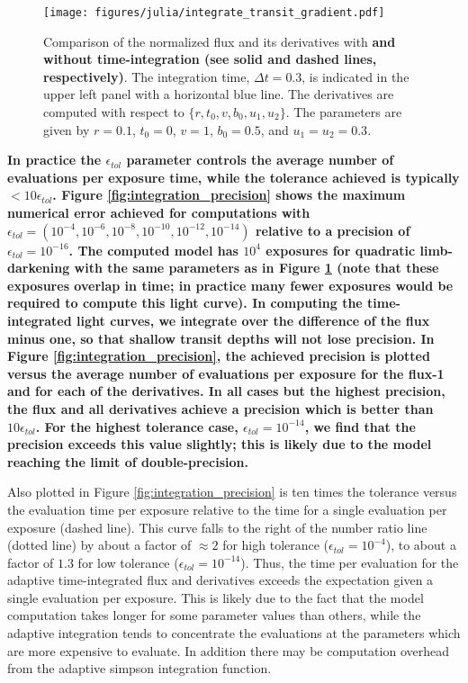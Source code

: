 \documentclass[modern,trackchanges]{aastex63}
\begin{document}
\begin{figure}
    \begin{centering}
    \texttt{[image: figures/julia/integrate\_transit\_gradient.pdf]}
    \caption{Comparison of the normalized flux and its derivatives with {\bf and
    without time-integration (see solid and dashed lines, respectively)}.  
    The integration time, $\Delta t = 0.3$, is indicated in the
    upper left panel with a horizontal blue line. The derivatives are computed with
    respect to $\{r,t_0,v,b_0,u_1,u_2\}$.  The parameters are given by $r=0.1$,
    $t_0 = 0$, {\bf $v=1$}, $b_0=0.5$, and $u_1=u_2=0.3$. 
    \label{fig:integrated_derivs}}
    \end{centering}
\end{figure}

{\bf In practice the $\epsilon_{tol}$ parameter controls the average number of evaluations
per exposure time, while the tolerance achieved is typically $<10 \epsilon_{tol}$.
Figure \ref{fig:integration_precision} shows the maximum numerical error achieved
for computations with $\epsilon_{tol} = (10^{-4},10^{-6},10^{-8},10^{-10},10^{-12},10^{-14})$
relative to a precision of $\epsilon_{tol} = 10^{-16}$.    The
computed model has $10^4$ exposures for quadratic limb-darkening with the same parameters 
as in Figure \ref{fig:integrated_derivs}
(note that these exposures overlap in time;  in practice many fewer exposures would
be required to compute this light curve).  In computing the time-integrated light
curves, we integrate over the difference of the flux minus one, so that shallow
transit depths will not lose precision.  In Figure \ref{fig:integration_precision},
the achieved precision is plotted versus the average number of evaluations per exposure
for the flux-1 and for each of the derivatives.  In all cases but the highest precision,
the flux and all derivatives achieve a precision which is better than $10 \epsilon_{tol}$.
For the highest tolerance case, $\epsilon_{tol} = 10^{-14}$, we find that the
precision exceeds this value slightly;  this is likely due to the model reaching
the limit of double-precision.

Also plotted in Figure \ref{fig:integration_precision} is ten times the
tolerance versus the evaluation time
per exposure relative to the time for a single evaluation per exposure
(dashed line).  This
curve falls to the right of the number ratio line (dotted line) by about 
a factor of $\approx 2$
for high tolerance ($\epsilon_{tol} = 10^{-4}$), to about a factor of $1.3$
for low tolerance ($\epsilon_{tol} = 10^{-14}$).  Thus, the time per
evaluation for the adaptive time-integrated flux and derivatives exceeds the 
expectation given a single evaluation per exposure.  This is likely due to 
the fact that the model computation takes longer for some parameter values 
than others, while the adaptive integration tends to concentrate the 
evaluations at the parameters which are more expensive to evaluate.  In 
addition there may be computation overhead from the adaptive simpson integration 
function.

}
\end{document}
